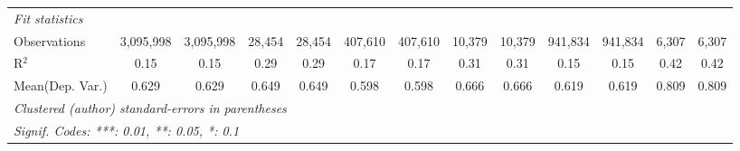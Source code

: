 \begin{tabular}{lcccccccccccc}
   \midrule
   \emph{Fit statistics}\\
   Observations                             & 3,095,998     & 3,095,998       & 28,454        & 28,454          & 407,610       & 407,610        & 10,379        & 10,379         & 941,834       & 941,834         & 6,307        & 6,307\\  
   R$^2$                                    & 0.15          & 0.15            & 0.29          & 0.29            & 0.17          & 0.17           & 0.31          & 0.31           & 0.15          & 0.15            & 0.42         & 0.42\\  
Mean(Dep. Var.) & 0.629 & 0.629 & 0.649 & 0.649 & 0.598 & 0.598 & 0.666 & 0.666 & 0.619 & 0.619 & 0.809 & 0.809 \\
   \midrule \midrule
   \multicolumn{13}{l}{\emph{Clustered (author) standard-errors in parentheses}}\\
   \multicolumn{13}{l}{\emph{Signif. Codes: ***: 0.01, **: 0.05, *: 0.1}}\\
\end{tabular}
\par\endgroup
